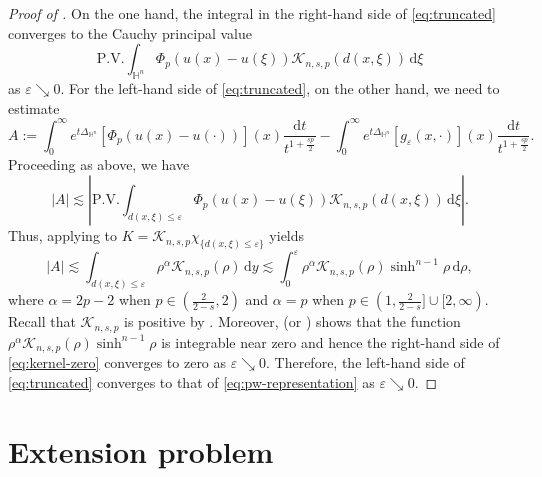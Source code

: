 \documentclass[11pt]{amsart}
\theoremstyle{plain}
\theoremstyle{definition}
\numberwithin{equation}{section}
\begin{document}
\begin{proof} [Proof of ]
On the one hand, the integral in the right-hand side of \eqref{eq:truncated} converges to the Cauchy principal value
\begin{equation*}
\mathrm{P.V.} \int_{\mathbb{H}^{n}} \Phi_p(u(x)-u(\xi)) \mathcal{K}_{n,s,p}(d(x,\xi)) \,\mathrm{d}\xi
\end{equation*}
as $\varepsilon \searrow 0$. For the left-hand side of \eqref{eq:truncated}, on the other hand, we need to estimate
\begin{equation*}
A:= \int_{0}^{\infty} e^{t\Delta_{\mathbb{H}^{n}}}[\Phi_{p}(u(x)-u(\cdot))](x) \frac{\mathrm{d}t}{t^{1+\frac{sp}{2}}} - \int_{0}^{\infty} e^{t\Delta_{\mathbb{H}^{n}}}[g_{\varepsilon}(x,\cdot)](x) \frac{\mathrm{d}t}{t^{1+\frac{sp}{2}}}.
\end{equation*}
Proceeding as above, we have
\begin{equation*}
|A| \lesssim \left| \mathrm{P.V.} \int_{d(x, \xi)\leq \varepsilon} \Phi_{p}(u(x)-u(\xi)) \mathcal{K}_{n,s,p}(d(x, \xi)) \,\mathrm{d}\xi \right|.
\end{equation*}
Thus, applying  to $K = \mathcal{K}_{n,s,p}\chi_{\{d(x, \xi)\leq \varepsilon\}}$ yields
\begin{equation} \label{eq:kernel-zero}
|A| \lesssim \int_{d(x,\xi) \leq \varepsilon} \rho^{\alpha} \mathcal{K}_{n,s,p}(\rho) \,\mathrm{d}y \lesssim \int_{0}^{\varepsilon} \rho^{\alpha} \mathcal{K}_{n,s,p}(\rho) \sinh^{n-1}\rho \,\mathrm{d}\rho,
\end{equation}
where $\alpha = 2p-2$ when $p \in (\frac{2}{2-s}, 2)$ and $\alpha = p$ when $p \in (1, \frac{2}{2-s}] \cup [2, \infty)$. Recall that $\mathcal{K}_{n,s,p}$ is positive by . Moreover,  (or ) shows that the function $\rho^{\alpha} \mathcal{K}_{n,s,p}(\rho) \sinh^{n-1}\rho$ is integrable near zero and hence the right-hand side of \eqref{eq:kernel-zero} converges to zero as $\varepsilon \searrow 0$. Therefore, the left-hand side of \eqref{eq:truncated} converges to that of \eqref{eq:pw-representation} as $\varepsilon \searrow 0$.
\end{proof}


\section{Extension problem} \label{sec:extension}

\end{document}
